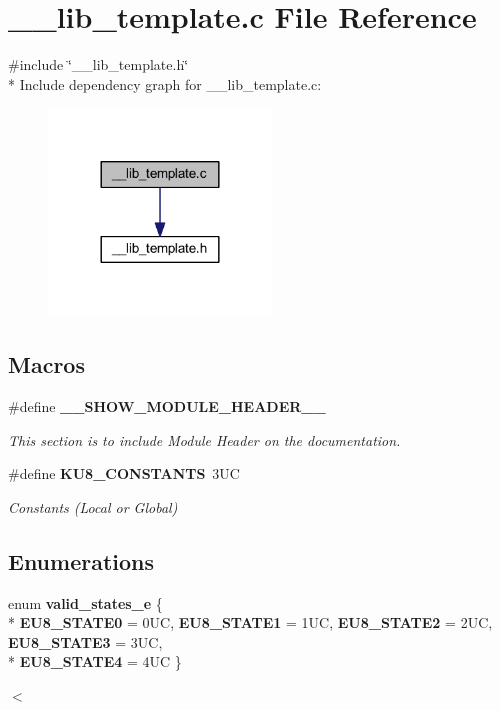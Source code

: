 \section{\-\_\-\-\_\-lib\-\_\-template.\-c File Reference}
\label{____lib__template_8c}
{\ttfamily \#include \char`\"{}\-\_\-\-\_\-lib\-\_\-template.\-h\char`\"{}}\\*
Include dependency graph for \-\_\-\-\_\-lib\-\_\-template.\-c\-:\nopagebreak
\begin{figure}[H]
\begin{center}
\leavevmode
\includegraphics[width=168pt]{____lib__template_8c__incl}
\end{center}
\end{figure}
\subsection*{Macros}
\begin{DoxyCompactItemize}
\item 
\#define {\bf \-\_\-\-\_\-\-S\-H\-O\-W\-\_\-\-M\-O\-D\-U\-L\-E\-\_\-\-H\-E\-A\-D\-E\-R\-\_\-\-\_\-}
\begin{DoxyCompactList}\small\item\em This section is to include Module Header on the documentation. \end{DoxyCompactList}\item 
\#define {\bf K\-U8\-\_\-\-C\-O\-N\-S\-T\-A\-N\-T\-S}~3\-U\-C
\begin{DoxyCompactList}\small\item\em Constants (Local or Global) \end{DoxyCompactList}\end{DoxyCompactItemize}
\subsection*{Enumerations}
\begin{DoxyCompactItemize}
\item 
enum {\bf valid\-\_\-states\-\_\-e} \{ \\*
{\bf E\-U8\-\_\-\-S\-T\-A\-T\-E0} =  0\-U\-C, 
{\bf E\-U8\-\_\-\-S\-T\-A\-T\-E1} =  1\-U\-C, 
{\bf E\-U8\-\_\-\-S\-T\-A\-T\-E2} =  2\-U\-C, 
{\bf E\-U8\-\_\-\-S\-T\-A\-T\-E3} =  3\-U\-C, 
\\*
{\bf E\-U8\-\_\-\-S\-T\-A\-T\-E4} =  4\-U\-C
 \}
\begin{DoxyCompactList}\small\item\em $<$ \end{DoxyCompactList}\end{DoxyCompactItemize}
